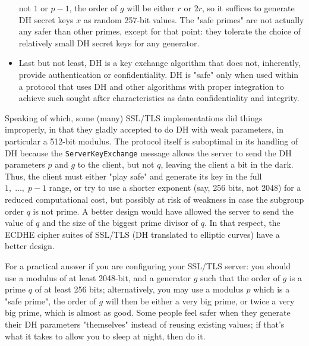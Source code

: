 \begin{itemize}
    not $1$ or $p-1$, the order of $g$ will be either $r$ or $2r$, so it suffices to generate DH secret keys
    $x$ as random 257-bit values.
    The "safe primes" are not actually any safer than other primes,
    except for that point: they tolerate the choice of relatively small DH secret keys for any generator.
    \item Last but not least, DH is a key exchange algorithm that does not,
    inherently, provide authentication or confidentiality.
    DH is "safe" only when used within a protocol that uses DH and other algorithms with proper
    integration to achieve such sought after characteristics as data confidentiality and integrity.
\end{itemize}

Speaking of which, some (many) SSL/TLS implementations did things improperly, in that they
gladly accepted to do DH with weak parameters, in particular a 512-bit modulus.
The protocol itself is suboptimal in its handling of DH because the \texttt{ServerKeyExchange}
message allows the server to send the DH parameters $p$ and $g$ to the client, but not $q$,
leaving the client a bit in the dark.
Thus, the client must either "play safe" and generate its key in the full $1, \;\dots,\; p-1$ range,
or try to use a shorter exponent (say, 256 bits, not 2048) for a reduced computational cost,
but possibly at risk of weakness in case the subgroup order $q$ is not prime.
A better design would have allowed the server to send the value of $q$ and the size of the
biggest prime divisor of $q$.
In that respect, the ECDHE cipher suites of SSL/TLS (DH translated to elliptic curves)
have a better design.

For a practical answer if you are configuring your SSL/TLS server:
you should use a modulus of at least 2048-bit, and a generator $g$ such that the order
of $g$ is a prime $q$ of at least 256 bits;
alternatively, you may use a modulus $p$ which
is a "safe prime", the order of $g$ will then be either a very big prime, or twice
a very big prime, which is almost as good.
Some people feel safer when they generate their DH parameters
"themselves" instead of reusing existing values;
if that's what it takes
to allow you to sleep at night, then do it.

